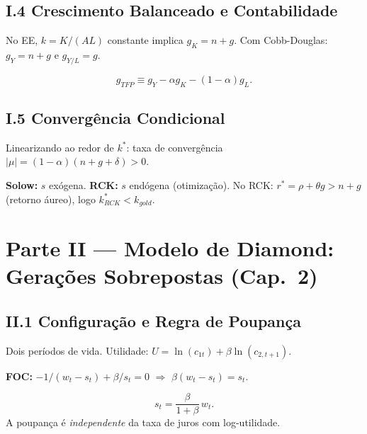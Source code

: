 \documentclass[12pt, a4paper]{article}
\begin{document}
\subsection*{I.4 Crescimento Balanceado e Contabilidade}

No EE, $k = K/(AL)$ constante implica $g_K = n+g$. Com Cobb-Douglas: $g_Y = n+g$ e $g_{Y/L} = g$.

\begin{resultbox}[title={Contabilidade do Crescimento (Resíduo de Solow)}]
\[
g_{TFP} \equiv g_Y - \alpha g_K - (1-\alpha)g_L.
\]
\end{resultbox}

\subsection*{I.5 Convergência Condicional}

Linearizando ao redor de $k^*$: taxa de convergência $|\mu| = (1-\alpha)(n+g+\delta) > 0$.

\begin{provabox}[title={Solow vs.\ RCK --- Diferença Fundamental}]
\textbf{Solow:} $s$ exógena. \textbf{RCK:} $s$ endógena (otimização). No RCK: $r^* = \rho+\theta g > n+g$ (retorno áureo), logo $k_{RCK}^* < k_{gold}$.
\end{provabox}

\section*{\large\color{cyanrbc} Parte II --- Modelo de Diamond: Gerações Sobrepostas (Cap.\ 2)}

\subsection*{II.1 Configuração e Regra de Poupança}

Dois períodos de vida. Utilidade: $U = \ln(c_{1t}) + \beta\ln(c_{2,t+1})$.

\textbf{FOC:} $-1/(w_t - s_t) + \beta/s_t = 0$ $\Rightarrow$ $\beta(w_t-s_t) = s_t$.

\begin{resultbox}[title={Poupança Ótima no Modelo de Diamond}]
\[
s_t = \frac{\beta}{1+\beta}\,w_t.
\]
A poupança é \emph{independente} da taxa de juros com log-utilidade.
\end{resultbox}
\end{document}
